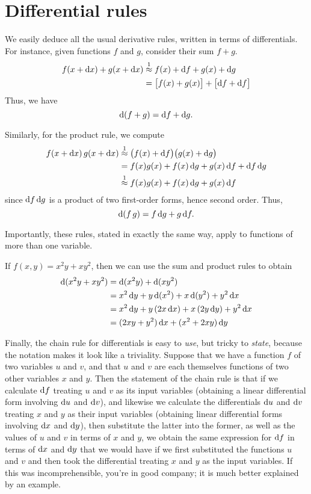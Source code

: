 \documentclass[12pt]{amsart}
\begin{document}

\section{Differential rules}
\label{sec:differential-rules}

We easily deduce all the usual derivative rules, written in terms of differentials.
For instance, given functions $f$ and $g$, consider their sum $f+g$.
\begin{align*}
  f(x+\mathrm{d} x) + g(x+\mathrm{d} x)
  &\mathrel{\overset{1}{\approx}} f(x) + \mathrm{d} f + g(x) + \mathrm{d} g\\
  &= \big[f(x) + g(x)\big] + \big[ \mathrm{d} f + \mathrm{d} f \big]
\end{align*}
Thus, we have
\[ \mathrm{d}(f+g) = \mathrm{d} f + \mathrm{d} g. \]

Similarly, for the product rule, we compute
\begin{align*}
  f(x+\mathrm{d} x) \, g(x+\mathrm{d} x)
  &\mathrel{\overset{1}{\approx}} \big(f(x)+\mathrm{d} f\big)\big(g(x) + \mathrm{d} g \big)\\
  &= f(x) g(x) + f(x) \,\mathrm{d} g + g(x) \,\mathrm{d} f + \mathrm{d} f\,\mathrm{d} g\\
  &\mathrel{\overset{1}{\approx}} f(x) g(x) + f(x) \,\mathrm{d} g + g(x) \,\mathrm{d} f
\end{align*}
since $\mathrm{d} f\,\mathrm{d} g$ is a product of two first-order forms, hence second order.
Thus,
\[ \mathrm{d}(f\,g) = f\,\mathrm{d} g + g\,\mathrm{d} f.\]

Importantly, these rules, stated in exactly the same way, apply to functions of more than one variable.
\begin{eg}\label{eg:twovar-differential}
  If $f(x,y) = x^2y + xy^2$, then we can use the sum and product rules to obtain
  \begin{align*}
    \mathrm{d}(x^2y + xy^2) &= \mathrm{d}(x^2y) + \mathrm{d}(xy^2)\\
    &= x^2\,\mathrm{d} y + y \,\mathrm{d}(x^2) + x \,\mathrm{d}(y^2) + y^2\,\mathrm{d} x\\
    &= x^2\,\mathrm{d} y + y \,(2x\,\mathrm{d} x) + x\, (2y\,\mathrm{d} y) + y^2\,\mathrm{d} x\\
    &= (2xy + y^2)\,\mathrm{d} x + (x^2+2xy)\,\mathrm{d} y
  \end{align*}
\end{eg}

Finally, the chain rule for differentials is easy to \emph{use}, but tricky to \emph{state}, because the notation makes it look like a triviality.
Suppose that we have a function $f$ of two variables $u$ and $v$, and that $u$ and $v$ are each themselves functions of two other variables $x$ and $y$.
Then the statement of the chain rule is that if we calculate $\mathrm{d} f$ treating $u$ and $v$ as its input variables (obtaining a linear differential form involving $\mathrm{d} u$ and $\mathrm{d} v$), and likewise we calculate the differentials $\mathrm{d} u$ and $\mathrm{d} v$ treating $x$ and $y$ as their input variables (obtaining linear differential forms involving $\mathrm{d} x$ and $\mathrm{d} y$), then substitute the latter into the former, as well as the values of $u$ and $v$ in terms of $x$ and $y$, we obtain the same expression for $\mathrm{d} f$ in terms of $\mathrm{d} x$ and $\mathrm{d} y$ that we would have if we first substituted the functions $u$ and $v$ and then took the differential treating $x$ and $y$ as the input variables.
If this was incomprehensible, you're in good company; it is much better explained by an example.
\end{document}
